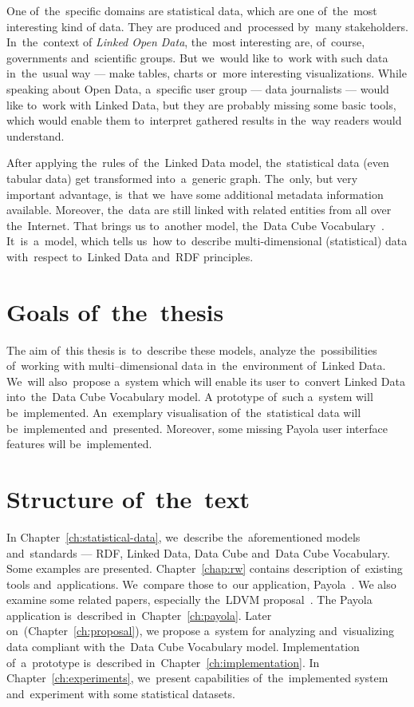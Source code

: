 One of~the~specific domains are statistical data, which are one of~the~most interesting kind
of data. They are produced and~processed by~many stakeholders. In~the~context of
\emph{Linked Open Data}, the~most interesting are, of~course, governments and~scientific groups.
But we~would like to~work with such data in~the~usual
way --- make tables, charts or~more interesting visualizations. While speaking about Open Data, a~specific
user group --- data journalists --- would like to~work with Linked Data, but they are probably
missing some basic tools, which would enable them to~interpret gathered results
in the~way readers would understand.

After applying the~rules of~the~Linked Data model, the~statistical data (even tabular data)
get transformed into~a~generic graph. The~only, but very important advantage, is~that we~have some additional
metadata information available. Moreover, the~data are still linked with related entities from all over the~Internet.
That brings
us to~another model, the~Data Cube Vocabulary~\cite{dcv}. It~is~a~model, which tells us~how to~describe
multi-dimensional (statistical) data with~respect to~Linked Data and~RDF 
principles.

\section*{Goals of~the~thesis}

The aim of~this thesis is~to~describe these models, analyze the~possibilities of~working
with multi--dimensional data in~the~environment of~Linked Data. We~will also~propose a~system
which will enable its user to~convert Linked Data into~the~Data Cube Vocabulary model.
A prototype of~such a~system will be~implemented. An~exemplary visualisation of~the~statistical
data will be~implemented and~presented. Moreover, some missing Payola user interface features 
will be~implemented.

\section*{Structure of~the~text}
In Chapter~\ref{ch:statistical-data}, we~describe the~aforementioned 
models and~standards --- RDF, Linked Data, Data Cube and~Data Cube Vocabulary. 
Some examples are presented. Chapter~\ref{chap:rw} contains description of~existing tools and~applications. We~compare those to~our application, Payola~\cite{payola}.
We also examine some related papers, especially the~LDVM proposal~\cite{ldvm}. 
The Payola application is~described in~Chapter~\ref{ch:payola}. Later on~(Chapter~\ref{ch:proposal}),
we propose a~system
for analyzing and~visualizing data compliant with the~Data Cube Vocabulary model.
Implementation of~a~prototype is~described in~Chapter~\ref{ch:implementation}.
In Chapter~\ref{ch:experiments}, we~present capabilities of~the~implemented system
and~experiment with some statistical datasets.
